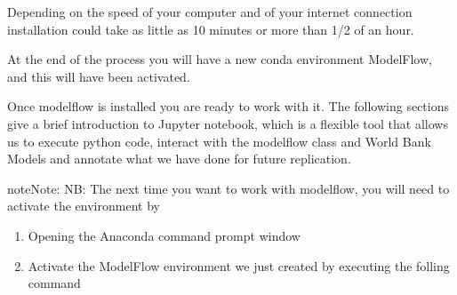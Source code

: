 \documentclass[letterpaper,10pt,english]{jupyterBook}
\begin{document}
\begin{sphinxVerbatim}[commandchars=\\\{\}]
          
  
  
     
    
   
   
   

\end{sphinxVerbatim}

\sphinxAtStartPar
Depending on the speed of your computer and of your internet connection installation could take as little as 10 minutes or more than 1/2 of an hour.

\sphinxAtStartPar
At the end of the process you will have a new conda environment ModelFlow, and this will have been activated.

\sphinxAtStartPar
Once modelflow is installed you are ready to work with it.  The following sections give a brief introduction to Jupyter notebook, which is a flexible tool that allows us to execute python code, interact with the modelflow class and World Bank Models and annotate what we have done for future replication.

\begin{sphinxadmonition}{note}{Note:}
\sphinxAtStartPar
NB: The next time you want to work with modelflow, you will need to activate the  environment by
\begin{enumerate}
%
\item {} 
\sphinxAtStartPar
Opening the Anaconda command prompt window

\item {} 
\sphinxAtStartPar
Activate the ModelFlow environment we just created by executing the folling command

\end{enumerate}

\sphinxAtStartPar
{}
\end{sphinxadmonition}
\end{document}
